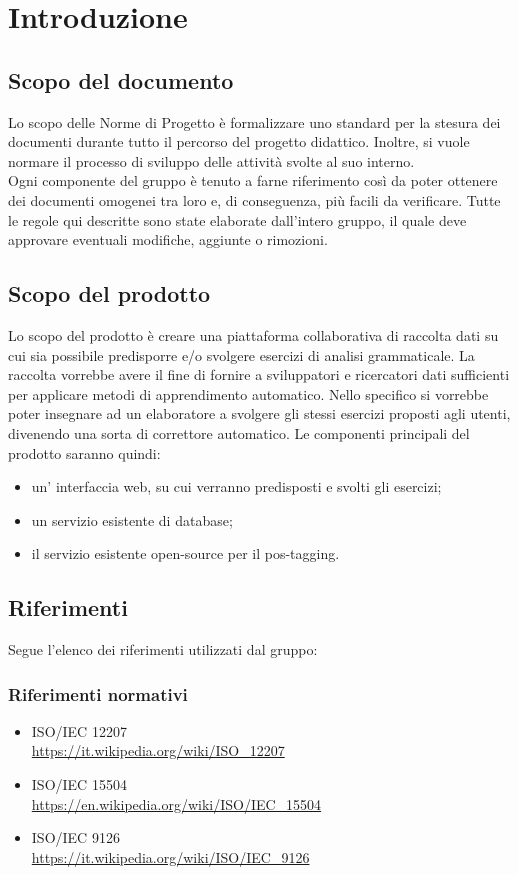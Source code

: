 \documentclass[11pt,a4paper]{article}
\begin{document}
	\tableofcontents
	\newpage
	
	\section{Introduzione}
	\subsection{Scopo del documento}
	Lo scopo delle Norme di Progetto è formalizzare uno standard per la stesura dei documenti durante tutto il percorso del progetto didattico. Inoltre, si vuole normare il processo di sviluppo delle attività svolte al suo interno. 
	\\Ogni componente del gruppo è tenuto a farne riferimento così da poter ottenere dei documenti omogenei tra loro e, di conseguenza, più facili da verificare. 
	Tutte le regole qui descritte sono state elaborate dall'intero gruppo, il quale deve approvare eventuali modifiche, aggiunte o rimozioni.
	\subsection{Scopo del prodotto}
	Lo scopo del prodotto è creare una piattaforma collaborativa di raccolta dati su cui sia possibile predisporre e/o svolgere esercizi di analisi grammaticale. La raccolta vorrebbe avere il fine di fornire a sviluppatori e ricercatori dati sufficienti per applicare metodi di apprendimento automatico. Nello specifico si vorrebbe poter insegnare ad un elaboratore a svolgere gli stessi esercizi proposti agli utenti, divenendo una sorta di correttore automatico.  
	Le componenti principali del prodotto saranno quindi:
	\begin{itemize}
		\item un' interfaccia web, su cui verranno predisposti e svolti gli esercizi;
		\item un servizio esistente di database;
		\item il servizio esistente open-source per il pos-tagging.
	\end{itemize}
	
	\subsection{Riferimenti}
	Segue l'elenco dei riferimenti utilizzati dal gruppo:
	\subsubsection{Riferimenti normativi}
	\begin{itemize}
		\item ISO/IEC 12207 \\
		\url {https://it.wikipedia.org/wiki/ISO\_12207}
		\item ISO/IEC 15504 \\
		\url {https://en.wikipedia.org/wiki/ISO/IEC\_15504}
		\item ISO/IEC 9126 \\
		\url {https://it.wikipedia.org/wiki/ISO/IEC\_9126}
	\end{itemize}	
	
\end{document}
